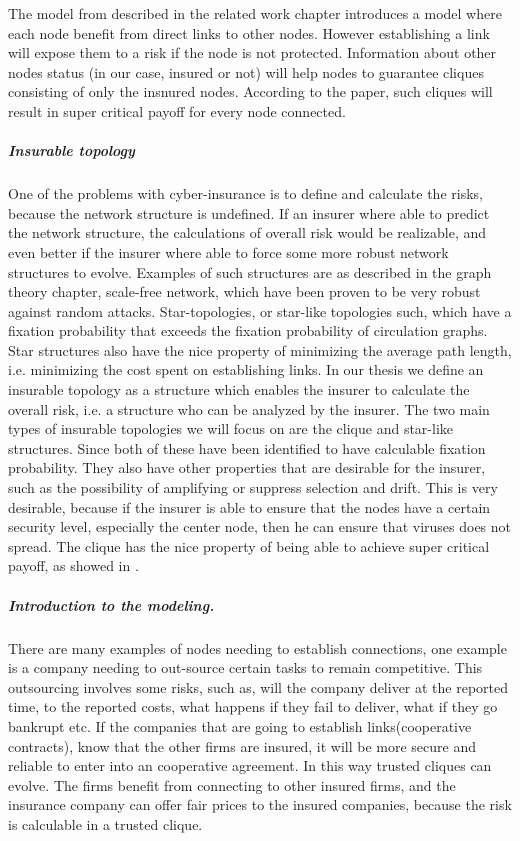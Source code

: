 The model from \cite{contagion} described in the related work chapter introduces a model where each node benefit from direct links to other nodes. However establishing a link will expose them to a risk if the node is not protected. Information about other nodes status (in our case, insured or not) will help nodes to guarantee cliques consisting of only the insnured nodes. According to the paper, such cliques will result in super critical payoff for every node connected. 
\subparagraph{Insurable topology}
One of the problems with cyber-insurance is to define and calculate the risks, because the network structure is undefined. If an insurer where able to predict the network structure, the calculations of overall risk would be realizable, and even better if the insurer where able to force some more robust network structures to evolve. 
Examples of such structures are as described in the graph theory chapter, scale-free network, which have been proven to be very robust against random attacks. Star-topologies, or star-like topologies such, which have a fixation probability that exceeds the fixation probability of circulation graphs. Star structures also have the nice property of minimizing the average path length, i.e. minimizing the cost spent on establishing links.
In our thesis we define an insurable topology as a structure which enables the insurer to calculate the overall risk, i.e. a structure who can be analyzed by the insurer.
The two main types of insurable topologies we will focus on are the clique and star-like structures. Since both of these have been identified to have calculable fixation probability. They also have other properties that are desirable for the insurer, such as the possibility of amplifying or suppress selection and drift. This is very desirable, because if the insurer is able to ensure that the nodes have a certain security level, especially the center node, then he can ensure that viruses does not spread.
The clique has the nice property of being able to achieve super critical payoff, as showed in \cite{contagion}. 


\subparagraph{Introduction to the modeling.}
There are many examples of nodes needing to establish connections, one example is a company needing to out-source certain tasks to remain competitive. This outsourcing involves some risks, such as, will the company deliver at the reported time, to the reported costs, what happens if they fail to deliver, what if they go bankrupt etc. If the companies that are going to establish links(cooperative contracts), know that the other firms are insured, it will be more secure and reliable to enter into an cooperative agreement. In this way trusted cliques can evolve. The firms benefit from connecting to other insured firms, and the insurance company can offer fair prices to the insured companies, because the risk is calculable in a trusted clique.

